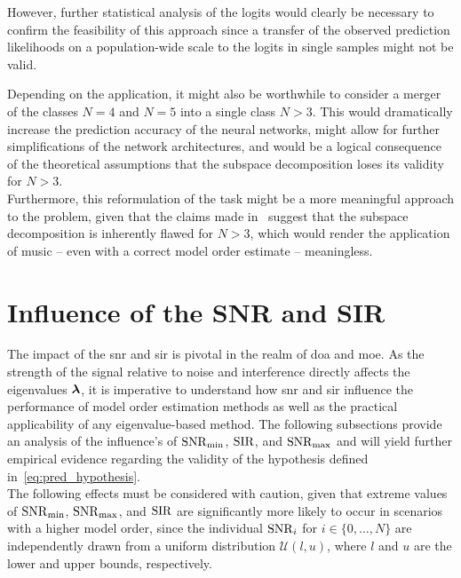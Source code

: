 However, further statistical analysis of the logits would clearly be necessary to confirm the feasibility of this approach since
a transfer of the observed prediction likelihoods on a population-wide scale to the logits in single samples might not be
valid.

Depending on the application, it might also be worthwhile to consider a merger of the classes \( N = 4 \) and \( N = 5 \) into a single class \( N > 3 \).
This would dramatically increase the prediction accuracy of the neural networks, might allow for further simplifications of
the network architectures, and would be a logical consequence of the theoretical assumptions that the subspace decomposition
loses its validity for \( N > 3 \). \\
Furthermore, this reformulation of the task might be a more meaningful approach to the problem, given that the claims made
in~\cite{barthelme21sub} suggest that the subspace decomposition is inherently flawed for \( N > 3 \), which would render
the application of \gls{music} -- even with a correct model order estimate -- meaningless.


\section{Influence of the SNR and SIR}
\label{sec:influence_snr_sir}

The impact of the \gls{snr} and \gls{sir} is pivotal in the realm of \gls{doa} and \gls{moe}. As the strength of the
signal relative to noise and interference directly affects the eigenvalues \( \boldsymbol{\lambda} \), it is imperative to
understand how \gls{snr} and \gls{sir} influence the performance of model order estimation methods as well as the
practical applicability of any eigenvalue-based method. The following subsections provide an analysis of the influence's
of \( \mathrm{SNR}_{\min} \), \( \mathrm{SIR} \), and \( \mathrm{SNR}_{\max} \) and will yield further empirical evidence regarding the validity of the
hypothesis defined in~\autoref{eq:pred_hypothesis}.\\
The following effects must be considered with caution, given that extreme values of \( \mathrm{SNR}_{\min} \), \( \mathrm{SNR}_{\max} \), and
\( \mathrm{SIR} \) are significantly more likely to occur in scenarios with a higher model order, since the individual \( \mathrm{SNR}_i \)
for \( i \in \{0, \ldots, N\} \) are independently drawn from a uniform distribution \( \mathcal{U}(l,u) \),
where \( l \) and \( u \) are the lower and upper bounds, respectively.\\

